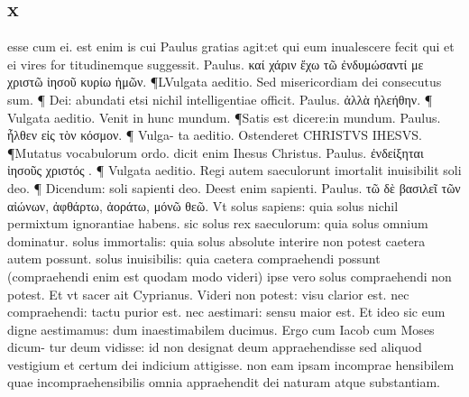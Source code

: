 \documentclass{article}
\begin{document}
\begin{pages}
\section*{x }
\marginpar{[ p.203 ]}\pstart esse cum ei. est enim is cui Paulus gratias agit:et qui eum inualescere fecit qui et ei vires for titudinemque suggessit. Paulus. καί χάριν ἔχω τῶ ἐνδυμώσαντί με χριστῶ ἰησοῦ  κυρίω ἡμῶν. ¶LVulgata aeditio. Sed misericordiam dei consecutus sum. ¶ Dei: abundati  etsi nichil intelligentiae officit. Paulus. ἀλλὰ ἠλεήθην. ¶ Vulgata aeditio. Venit in  hunc mundum. ¶Satis est dicere:in mundum. Paulus. ἦλθεν εἰς τὸν κόσμον. ¶ Vulga-  ta aeditio. Ostenderet CHRISTVS IHESVS. ¶Mutatus vocabulorum ordo. dicit enim  Ihesus Christus. Paulus. ἐνδείξηται ἰησοῦς χριστός . ¶ Vulgata aeditio. Regi autem  saeculorunt imortalit inuisibilit soli deo. ¶ Dicendum: soli sapienti deo. Deest enim sapienti. Paulus. τῶ δὲ βασιλεῖ τῶν αἰώνων, ἀφθάρτω, ἀοράτω, μόνῶ θεῶ. Vt solus sapiens: quia solus nichil permixtum ignorantiae habens. sic solus rex saeculorum: quia solus omnium dominatur. solus immortalis: quia solus absolute interire non potest caetera autem possunt. solus inuisibilis: quia caetera compraehendi possunt (compraehendi enim est quodam modo videri) ipse vero solus compraehendi non potest. Et vt sacer ait Cyprianus. Videri non potest: visu clarior est. nec compraehendi: tactu purior est. nec aestimari: sensu maior est. Et ideo sic eum digne aestimamus: dum inaestimabilem ducimus. Ergo cum Iacob cum Moses dicum- tur deum vidisse: id non designat deum appraehendisse sed aliquod vestigium et certum dei indicium attigisse. non eam ipsam incomprae hensibilem quae incompraehensibilis omnia appraehendit dei naturam atque substantiam.  \pend

\end{pages}
\end{document}
